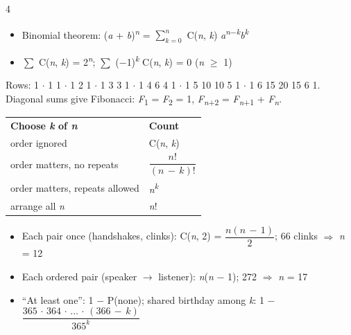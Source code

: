 \documentclass[10pt]{article}
\newcommand\sheethead[1]{\par\needspace{3\baselineskip}\vspace{1.6pt}{\color{FAUblue}\sffamily\bfseries #1}\par\nopagebreak\vspace{0.3pt}}
\begin{document}
\begin{multicols*}{4}
{\begin{itemize}
\item Binomial theorem: (\textit{a} + \textit{b})\textsuperscript{\textit{n}} = $\sum_{{k}=0}^{{n}} $ C(\textit{n}, \textit{k}) \textit{a}\textsuperscript{\textit{n}\ensuremath{-}\textit{k}}\textit{b}\textsuperscript{\textit{k}}
\item \ensuremath{\textstyle\sum} C(\textit{n}, \textit{k}) = 2\textsuperscript{\textit{n}}; \ensuremath{\textstyle\sum} (\ensuremath{-}1)\textsuperscript{\textit{k}} C(\textit{n}, \textit{k}) = 0 (\textit{n} \ensuremath{\geq} 1)
\end{itemize}\par{\color{black!72}Rows: 1 \ensuremath{\cdot} 1 1 \ensuremath{\cdot} 1 2 1 \ensuremath{\cdot} 1 3 3 1 \ensuremath{\cdot} 1 4 6 4 1 \ensuremath{\cdot} 1 5 10 10 5 1 \ensuremath{\cdot} 1 6 15 20 15 6 1. Diagonal sums give Fibonacci: \textit{F}\textsubscript{1} = \textit{F}\textsubscript{2} = 1, \textit{F}\textsubscript{\textit{n}+2} = \textit{F}\textsubscript{\textit{n}+1} + \textit{F}\textsubscript{\textit{n}}.}\par}
{\sheethead{Counting}\par{\setlength{\tabcolsep}{2.4pt}\renewcommand{\arraystretch}{0.92}\begin{tabularx}{\linewidth}{@{}l>{\raggedright\arraybackslash}X@{}}
\textbf{Choose \textit{k} of \textit{n}} & \textbf{Count} \\
order ignored & C(\textit{n}, \textit{k}) \\
order matters, no repeats & {\ensuremath{\dfrac{{n}!}{({n}\, -\, {k})!}}} \\
order matters, repeats allowed & \textit{n}\textsuperscript{\textit{k}} \\
arrange all \textit{n} & \textit{n}! \\
\end{tabularx}}\par\begin{itemize}
\item Each pair once (handshakes, clinks): C(\textit{n}, 2) = {\ensuremath{\dfrac{{n}({n}\, -\, 1)}{2}}}; 66 clinks \ensuremath{\Rightarrow} \textit{n} = 12
\item Each ordered pair (speaker \ensuremath{\to} listener): \textit{n}(\textit{n} \ensuremath{-} 1); 272 \ensuremath{\Rightarrow} \textit{n} = 17
\item “At least one”: 1 \ensuremath{-} P(none); shared birthday among \textit{k}: 1 \ensuremath{-} {\ensuremath{\dfrac{365\, \cdot \, 364\, \cdot \, …\, \cdot \, (366\, -\, {k})}{365^{{k}}}}}

\end{itemize}}
\end{multicols*}
\end{document}
